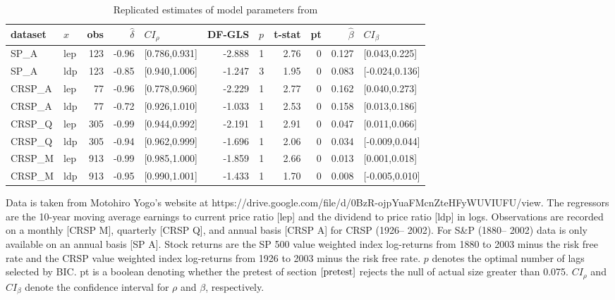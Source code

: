 \documentclass{article}
\begin{document}
\begin{table}[h!]
\small
\setlength\tabcolsep{5.3pt}
\centering
\caption{Replicated estimates of model parameters from \citet{campbell2006efficient}}
\label{tab:cy_sp}
\begin{threeparttable}
\begin{tabular}{llrrlrrrrrl}
  \hline
dataset & $x$ & obs & $\hat{\delta}$ & $CI_{\rho}$ & DF-GLS & $p$ &t-stat & pt & $\hat{\beta}$ & $CI_{\beta}$ \\ 
  \hline
  SP\_A & lep & 123 & -0.96 & [0.786,0.931] & -2.888 & 1 & 2.76 & 0 & 0.127 & [0.043,0.225] \\ 
  SP\_A & ldp & 123 & -0.85 & [0.940,1.006] & -1.247 & 3 & 1.95 & 0 & 0.083 & [-0.024,0.136] \\ 
  CRSP\_A & lep & 77 & -0.96 & [0.778,0.960] & -2.229 & 1 & 2.77 & 0 & 0.162 & [0.040,0.273] \\ 
  CRSP\_A & ldp & 77 & -0.72 & [0.926,1.010] & -1.033 & 1 & 2.53 & 0 & 0.158 & [0.013,0.186] \\ 
  CRSP\_Q & lep & 305 & -0.99 & [0.944,0.992] & -2.191 & 1 & 2.91 & 0 & 0.047 & [0.011,0.066] \\ 
  CRSP\_Q & ldp & 305 & -0.94 & [0.962,0.999] & -1.696 & 1 & 2.06 & 0 & 0.034 & [-0.009,0.044] \\ 
  CRSP\_M & lep & 913 & -0.99 & [0.985,1.000] & -1.859 & 1 & 2.66 & 0 & 0.013 & [0.001,0.018] \\ 
  CRSP\_M & ldp & 913 & -0.95 & [0.990,1.001] & -1.433 & 1 & 1.70 & 0 & 0.008 & [-0.005,0.010] \\ 
\hline
\end{tabular}
 \begin{tablenotes}
 \small
\item Data is taken from Motohiro Yogo's website at https://drive.google.com/file/d/0BzR-ojpYuaFMcnZteHFyWUVIUFU/view. The regressors are the 10-year moving average earnings to current price ratio [lep] and the dividend to price ratio [ldp] in logs. Observations are recorded on a monthly [CRSP M], quarterly [CRSP Q], and annual basis [CRSP A] for CRSP (1926– 2002). For S\&P (1880– 2002) data is only available on an annual basis [SP A]. Stock returns are the SP 500 value weighted index log-returns from 1880 to 2003 minus the risk free rate and the CRSP value weighted index log-returns from 1926 to 2003 minus the risk free rate. $p$ denotes the optimal number of lags selected by BIC. pt is a boolean denoting whether the pretest of section $\ref{pretest}$ rejects the null of actual size greater than 0.075. $CI_{\rho}$ and $CI_{\beta}$ denote the confidence interval for $\rho$ and $\beta$, respectively.
\end{tablenotes}
\end{threeparttable}
\end{table}
\end{document}
